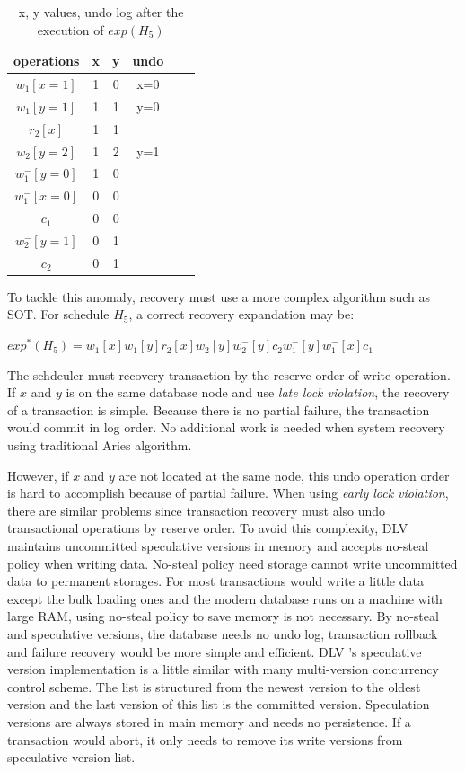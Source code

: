\documentclass[conference]{IEEEtran}
\begin{document}
\begin{table}[htb]
  \centering
  \begin{tabular}{|c|c|c|c|c|c|}
  \hline
operations & x &  y & undo   \\ 
  \hline
  \hline
  $w_1[x=1]$ & 1 & 0 & x=0  \\ 
  \hline
  $w_1[y=1]$ & 1 & 1 & y=0   \\
  \hline
  $r_2[x]$ & 1 & 1 &    \\
  \hline
  $w_2[y=2]$ & 1 & 2 & y=1  \\
  \hline
  $w^-_1[y=0]$ & 1 & 0 &   \\
  \hline
  $w^-_1[x=0]$ & 0 & 0 &   \\
  \hline

  $c_1$ & 0 & 0 &   \\
  \hline
  $w^-_2[y=1]$ & 0 & 1 &    \\
  \hline
  $c_2$ & 0 & 1 &  \\
  \hline
  \end{tabular}
\caption{x, y values, undo log after the execution of ${exp(H_5)}$}
\label{tbl:x_y_vlues}
\end{table}

To tackle this anomaly, recovery must use a more complex algorithm such as SOT\cite{UnifyCR:journals/is/AlonsoVABASW94}.
For schedule ${H_5}$, a correct recovery expandation may be: 
\begin{center}
${exp^*(H_5) = w_1[x]w_1[y]r_2[x]w_2[y]w^-_2[y]c_2w^-_1[y]w^-_1[x]c_1}$
\end{center}
The schdeuler must recovery transaction by the reserve order of write operation.
If ${x}$ and ${y}$ is on the same database node and use \emph{late lock violation}, the recovery of a transaction is simple.
Because there is no partial failure, the transaction would commit in log order.
No additional work is needed when system recovery using traditional Aries algorithm\cite{ARIES:journals/tods/MohanHLPS92}.

However, if ${x}$ and ${y}$ are not located at the same node, this undo operation order is hard to accomplish because of partial failure.
When using \emph{early lock violation}, there are similar problems since transaction recovery must also undo transactional operations by reserve order.
To avoid this complexity, DLV maintains uncommitted speculative versions in memory and accepts no-steal policy when writing data.
No-steal policy need storage cannot write uncommitted data to permanent storages.
For most transactions would write a little data except the bulk loading ones and the modern database runs on a machine with large RAM, using no-steal policy to save memory is not necessary. 
By no-steal and speculative versions, the database needs no undo log, transaction rollback and failure recovery would be more simple and efficient.
DLV 's speculative version implementation is a little similar with many multi-version concurrency control scheme.
The list is structured from the newest version to the oldest version and the last version of this list is the committed version.
Speculation versions are always stored in main memory and needs no persistence.
If a transaction would abort, it only needs to remove its write versions from speculative version list.
\end{document}
